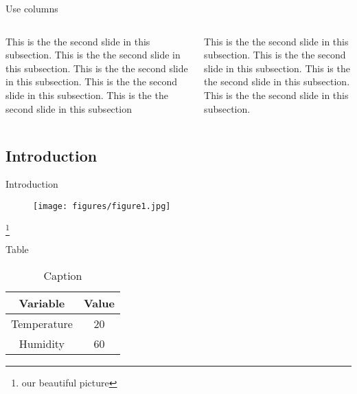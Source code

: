 \documentclass[aspectratio=169]{beamer}
\newcommand\blfootnote[1]{
\begingroup
\renewcommand\thefootnote{}\footnote{#1}
\addtocounter{footnote}{-1}
\endgroup
}
\begin{document}
\begin{frame}{Use columns}
    \begin{columns}
        \begin{column}{0.65\textwidth}
            This is the the second slide in this subsection.
            This is the the second slide in this subsection.
            This is the the second slide in this subsection.
            This is the the second slide in this subsection.
            This is the the second slide in this subsection \footnotemark[1]
        \end{column}
        \begin{column}{0.35\textwidth}
            This is the the second slide in this subsection.
            This is the the second slide in this subsection.
            This is the the second slide in this subsection.
            This is the the second slide in this subsection.
            \footnotemark[2]
        \end{column}
    \end{columns}
\end{frame}

\subsection{Introduction}

\begin{frame}{Introduction}
    \begin{figure}
        \texttt{[image: figures/figure1.jpg]}\\
        \label{fig:figureIntroduction}
    \end{figure}
    \blfootnote{our beautiful picture}
\end{frame}

\begin{frame}{Table}
    \begin{table}[]
        \centering
        \begin{tabular}{c|c}
            Variable & Value \\
            \hline
            Temperature & 20 \\
            Humidity & 60
        \end{tabular}
        \caption{Caption}
        \label{tab:my_label}
    \end{table}
\end{frame}
\end{document}
